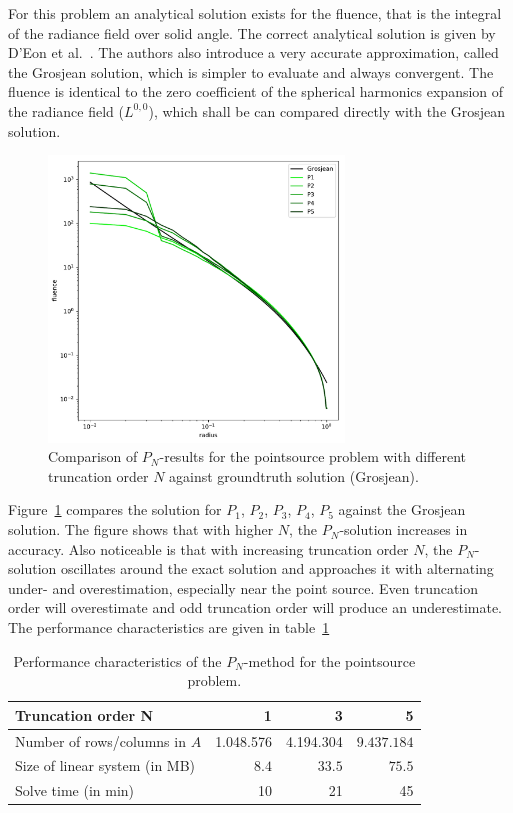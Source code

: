 For this problem an analytical solution exists for the fluence, that is the integral of the radiance field over solid angle. The correct analytical solution is given by D'Eon et al.~\cite{dEon11}. The authors also introduce a very accurate approximation, called the Grosjean solution, which is simpler to evaluate and always convergent. The fluence is identical to the zero coefficient of the spherical harmonics expansion of the radiance field ($L^{0,0}$), which shall be can compared directly with the Grosjean solution.
\begin{figure}[h]
\centering
\includegraphics[width=0.7\textwidth]{04_pn_method/results/pointsource_pn.pdf}
\caption{Comparison of $P_N$-results for the pointsource problem with different truncation order $N$ against groundtruth solution (Grosjean).}
\label{fig:pn_results_pointsource_1}
\end{figure}
Figure~\ref{fig:pn_results_pointsource_1} compares the solution for $P_1$, $P_2$, $P_3$, $P_4$, $P_5$ against the Grosjean solution. The figure shows that with higher $N$, the $P_N$-solution increases in accuracy. Also noticeable is that with increasing truncation order $N$, the $P_N$-solution oscillates around the exact solution and approaches it with alternating under- and overestimation, especially near the point source. Even truncation order will overestimate and odd truncation order will produce an underestimate. The performance characteristics are given in table~\ref{tab:results_pointsource}

\begin{table}[!h]
	\centering
	\caption{Performance characteristics of the $P_N$-method for the pointsource problem.}
	\label{tab:results_pointsource}
	\begin{tabular}{l r r r}
    \hline
	Truncation order \textbf{N}
    & 1 & 3 & 5
    \\
    \hline
    Number of rows/columns in $A$
    & 1.048.576 & 4.194.304 & $9.437.184$
    \\
    Size of linear system (in MB)
    & $8.4$ & $33.5$ & $75.5$
    \\
    Solve time (in min)
    & 10 & 21 & 45
	\end{tabular}
\end{table}

